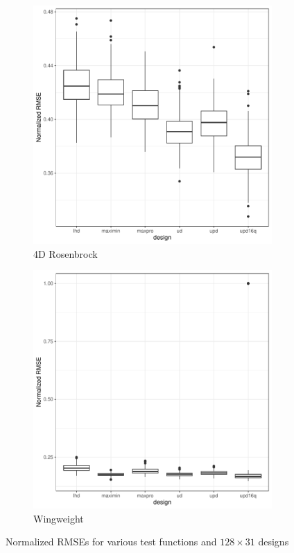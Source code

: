 \documentclass [PhD] {package/uclathes}
\begin{document}
\begin{figure}
\begin{adjustwidth}{-2cm}{-2cm}
\begin{subfigure}[b]{0.35\textwidth}
\end{subfigure}
\vfill
\begin{subfigure}[b]{0.35\textwidth}
\centering
\caption{4D Rosenbrock}
\includegraphics[width=\textwidth]{chapters/EGO/pdfs/Rosenbrock4d_128x31}
\end{subfigure}
\begin{subfigure}[b]{0.35\textwidth}
\centering
\caption{Wingweight}
\includegraphics[width=\textwidth]{chapters/EGO/pdfs/Wingweight_128x31}
\end{subfigure}
\caption{Normalized RMSEs for various test functions and $128 \times 31$ designs}
\label{fig:boxplots_128x31}
\end{adjustwidth}
\end{figure}
\end{document}
